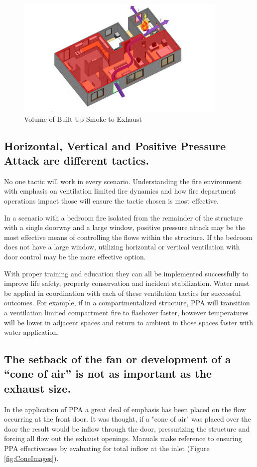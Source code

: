 \documentclass{article}
\begin{document}
\begin{figure}[H]
	\centering
	\includegraphics[width = 4in ]{0_Images/Tactical_Considerations/Understanding_Basics/SmokeToBeExhausted.pdf}
	\caption{Volume of Built-Up Smoke to Exhaust}
\end{figure}

\subsection{Horizontal, Vertical and Positive Pressure Attack are different tactics.} 
No one tactic will work in every scenario. Understanding the fire environment with emphasis on ventilation limited fire dynamics and how fire department operations impact those will ensure the tactic chosen is most effective.

In a scenario with a bedroom fire isolated from the remainder of the structure with a single doorway and a large window, positive pressure attack may be the most effective means of controlling the flows within the structure. If the bedroom does not have a large window, utilizing horizontal or vertical ventilation with door control may be the more effective option. 

With proper training and education they can all be implemented successfully to improve life safety, property conservation and incident stabilization.  Water must be applied in coordination with each of these ventilation tactics for successful outcomes.   For example, if in a compartmentalized structure, PPA will transition a ventilation limited compartment fire to flashover faster, however temperatures will be lower in adjacent spaces and return to ambient in those spaces faster with water application.

\subsection{The setback of the fan or development of a “cone of air” is not as important as the exhaust size.}
In the application of PPA a great deal of emphasis has been placed on the flow occurring at the front door. It was thought, if a "cone of air" was placed over the door the result would be inflow through the door, pressurizing the structure and forcing all flow out the exhaust openings. Manuals make reference to ensuring PPA effectiveness by evaluating for total inflow at the inlet (Figure \ref{fig:ConeImages}).
\end{document}
